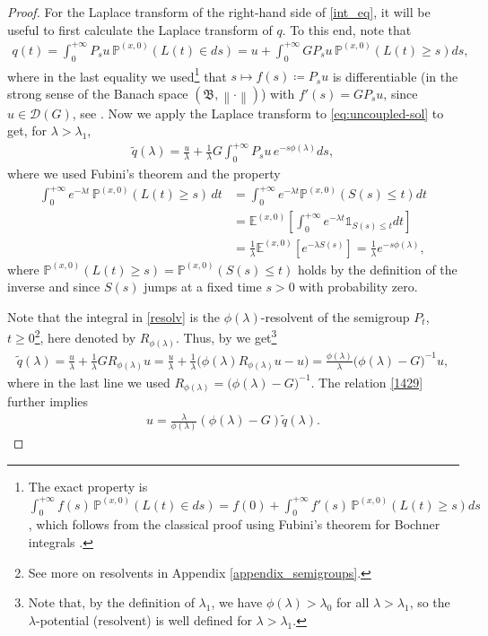 \documentclass[reqno]{amsart}
\theoremstyle{remark}
\numberwithin{equation}{section} %
\newcommand{\EE}{\mathds{E}}
\newcommand{\PP}{\mathds{P}}
\newcommand{\DD}{\mathcal{D}}
\newcommand{\wt}{\widetilde}
\newcommand{\1}{\mathds{1}}
\begin{document}
\begin{proof}
		For the Laplace transform of the right-hand side of \eqref{int_eq}, it will be useful to first calculate the Laplace transform of $q$. To this end, note that 
		\begin{align}\label{eq:uncoupled-sol}
			q(t)=\int_0^{+\infty}P_s u \,\PP^{(x,0)}(L(t)\in ds)=u+\int_0^{+\infty}GP_su\,\PP^{(x,0)}(L(t)\ge s)ds, 
		\end{align}
		where in the last equality we used\footnote{The exact property is $\int_0^{+\infty}f(s) \,\PP^{(x,0)}(L(t)\in ds)=f(0)+\int_0^{+\infty}f'(s)\,\PP^{(x,0)}(L(t)\ge s)ds$, which follows from the classical proof using Fubini's theorem for Bochner integrals \cite[Theorem 3.7.13]{hille1996functional}.} that $s\mapsto f(s)\coloneqq P_su$ is differentiable (in the strong sense of the Banach space $(\mathfrak{B}, \left\| \cdot \right\|)$) with $f'(s)=GP_su$, since $u\in \DD(G)$, see \cite[Section 1.3]{apple-semigr}. Now we apply the Laplace transform to \eqref{eq:uncoupled-sol} to get, {for $\lambda > \lambda_1$,}
		\begin{align}\label{resolv}
			\wt q(\lambda)=\frac{u}{\lambda}+\frac{1}{\lambda}G\int_0^{+\infty}P_su\,e^{-s\phi(\lambda)}ds,
		\end{align}
		where we used Fubini's theorem \cite[Theorem 3.7.13]{hille1996functional} and the property
		\begin{align}
			\int_0^{+\infty} e^{-\lambda t} \,\PP^{(x,0)}(L(t)\ge s) \, dt & = \int_0^{+\infty} e^{-\lambda t} \PP^{(x,0)}{(S(s)\leq  t)}dt\\
			&=\EE^{(x,0)}\left[\int_0^{+\infty} e^{-\lambda t} {\mathds{1}_{S(s)\leq t}}dt\right]\\
			&=\frac{1}{\lambda}\EE^{(x,0)}\left[e^{-\lambda S(s)}\right]=\frac{1}{\lambda} e^{-s\phi(\lambda)},
		\end{align}
		where $\PP^{(x,0)}(L(t)\ge s)=\PP^{(x,0)}(S(s)\leq  t)$ holds by the definition of the inverse and since $S(s)$ jumps at a fixed time $s>0$ with probability zero.
		
		Note that the integral in \eqref{resolv} is the $\phi(\lambda)$-resolvent of the semigroup $P_t$, $t\ge0$\footnote{See more on resolvents in Appendix \ref{appendix_semigroups}.}, here denoted by $R_{\phi(\lambda)}$. Thus, by \cite[Lemma 2.1.1]{apple-semigr} we get\footnote{{Note that, by the definition of $\lambda_1$, we have $\phi(\lambda) > \lambda_0$ for all $\lambda> \lambda_1$, so the $\lambda$-potential (resolvent) is well defined for $\lambda>\lambda_1$.}}
		\begin{align}\label{1429}
			\wt q(\lambda)=\frac{u}{\lambda}+\frac{1}{\lambda}G R_{\phi(\lambda)}u=\frac{u}{\lambda}+\frac{1}{\lambda}\big(\phi(\lambda) R_{\phi(\lambda)}u-u\big)=\frac{\phi(\lambda)}{\lambda}\big(\phi(\lambda)-G\big)^{-1}u,
		\end{align}
		where in the last line we used $R_{\phi(\lambda)}=\big(\phi(\lambda)-G\big)^{-1}$. The relation \eqref{1429} further implies
		\begin{align}
			u=\frac{\lambda}{\phi(\lambda)} (\phi(\lambda)-G) \widetilde{q}(\lambda).
			\label{332}
		\end{align}
		

\end{proof}
\end{document}
